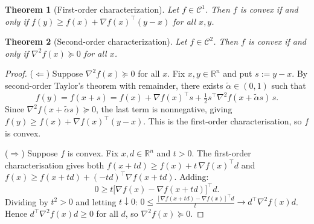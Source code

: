 \documentclass[11pt,a4paper]{report}
\theoremstyle{plain}
\newtheorem{theorem}{Theorem}[chapter]
\theoremstyle{definition}
\newcommand{\R}{\mathbb{R}}
\newcommand{\grad}{\nabla}
\newcommand{\hess}{\nabla^{2}}
\newcommand{\trans}{^{\top}}
\begin{document}
\begin{theorem}[First-order characterization]
Let $f\in\mathcal{C}^{1}$. Then $f$ is convex if and only if
$f(y)\ge f(x)+\grad f(x)\trans(y-x)$ for all $x,y$.
\end{theorem}

\begin{theorem}[Second-order characterization]\label{thm:convex-second-order}
Let $f\in\mathcal{C}^{2}$. Then $f$ is convex if and only if
$\hess f(x)\succeq 0$ for all $x$.
\end{theorem}
\begin{proof}
($\Leftarrow$) Suppose $\hess f(x)\succeq 0$ for all $x$. Fix $x,y\in\R^{n}$ and put $s:=y-x$. By second-order Taylor's theorem with remainder, there exists $\tilde{\alpha}\in(0,1)$ such that
\[
f(y)=f(x+s)=f(x)+\grad f(x)\trans s+\tfrac12 s\trans\hess f(x+\tilde{\alpha}s)\,s.
\]
Since $\hess f(x+\tilde{\alpha}s)\succeq 0$, the last term is nonnegative, giving
$f(y)\ge f(x)+\grad f(x)\trans(y-x)$.
This is the first-order characterisation, so $f$ is convex.

($\Rightarrow$) Suppose $f$ is convex. Fix $x,d\in\R^{n}$ and $t>0$. The first-order characterisation gives both $f(x+td)\ge f(x)+t\,\grad f(x)\trans d$ and $f(x)\ge f(x+td)+(-td)\trans\grad f(x+td)$. Adding:
\[
0\ge t\bigl[\grad f(x)-\grad f(x+td)\bigr]\trans d.
\]
Dividing by $t^{2}>0$ and letting $t\downarrow 0$:
$0\le\frac{[\grad f(x+td)-\grad f(x)]\trans d}{t}\to d\trans\hess f(x)d$.
Hence $d\trans\hess f(x)d\ge 0$ for all $d$, so $\hess f(x)\succeq 0$.
\end{proof}
\end{document}
